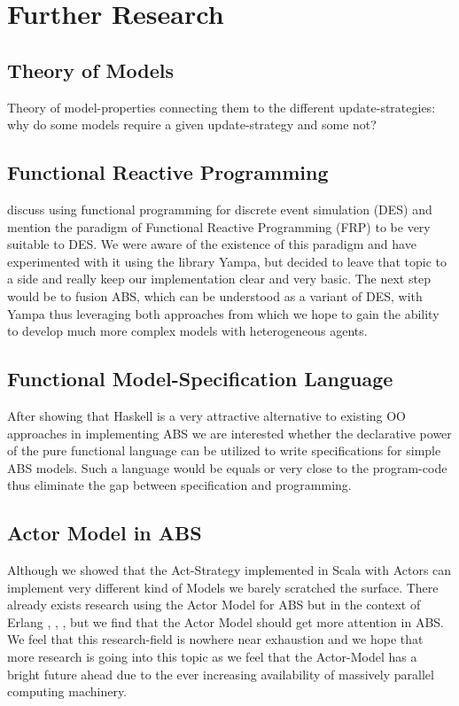 \section{Further Research}

\subsection{Theory of Models}
Theory of model-properties connecting them to the different update-strategies: why do some models require a given update-strategy and some not?

\subsection{Functional Reactive Programming}
\cite{jankovic_functional_2007} discuss using functional programming for discrete event simulation (DES) and mention the paradigm of Functional Reactive Programming (FRP) to be very suitable to DES. We were aware of the existence of this paradigm and have experimented with it using the library Yampa, but decided to leave that topic to a side and really keep our implementation clear and very basic. The next step would be to fusion ABS, which can be understood as a variant of DES, with Yampa thus leveraging both approaches from which we hope to gain the ability to develop much more complex models with heterogeneous agents.

\subsection{Functional Model-Specification Language}
After showing that Haskell is a very attractive alternative to existing OO approaches in implementing ABS we are interested whether the declarative power of the pure functional language can be utilized to write specifications for simple ABS models. Such a language would be equals or very close to the program-code thus eliminate the gap between specification and programming.

\subsection{Actor Model in ABS}
Although we showed that the Act-Strategy implemented in Scala with Actors can implement very different kind of Models we barely scratched the surface. There already exists research using the Actor Model for ABS but in the context of Erlang \cite{varela_modelling_2004}, \cite{di_stefano_using_2005}, \cite{di_stefano_exat:_2007}, \cite{sher_agent-based_2013} but we find that the Actor Model should get more attention in ABS. We feel that this research-field is nowhere near exhaustion and we hope that more research is going into this topic as we feel that the Actor-Model has a bright future ahead due to the ever increasing availability of massively parallel computing machinery.